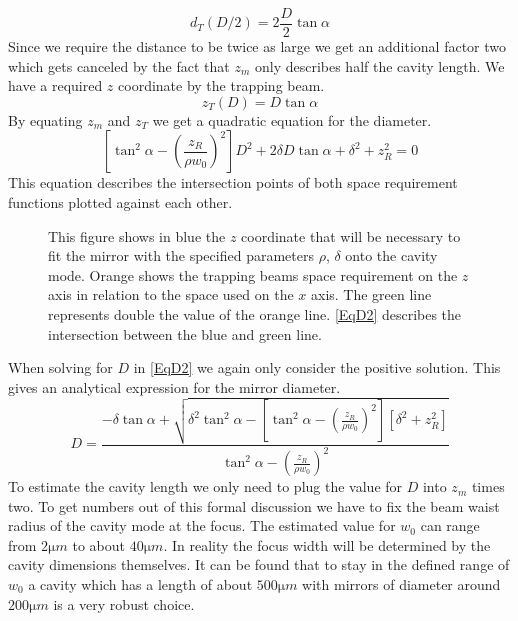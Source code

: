 $$d_{\si{T}}(D/2)=2\frac{D}{2}\tan\alpha$$
Since we require the distance to be twice as large we get an additional factor two which gets canceled by the fact that $z_{\si{m}}$ only describes half the cavity length. We have a required $z$ coordinate by the trapping beam.
\begin{equation}
	z_{\si{T}}(D)=D\tan\alpha
\end{equation}
By equating $z_{\si{m}}$ and $z_{\si{T}}$ we get a quadratic equation for the diameter.
\begin{equation}\label{EqD2}
	\left[\tan^2\alpha-\left(\frac{z_{\si{R}}}{\rho w_0}\right)^2\right]D^2+2\delta D\tan\alpha+\delta^2+z_{\si{R}}^2=0
\end{equation}
This equation describes the intersection points of both space requirement functions plotted against each other.
\begin{figure}[H]
	
	\caption{This figure shows in blue the $z$ coordinate that will be necessary to fit the mirror with the specified parameters $\rho$, $\delta$ onto the cavity mode. Orange shows the trapping beams space requirement on the $z$ axis in relation to the space used on the $x$ axis. The green line represents double the value of the orange line. \autoref{EqD2} describes the intersection between the blue and green line.}
\end{figure}
When solving for $D$ in \autoref{EqD2} we again only consider the positive solution. This gives an analytical expression for the mirror diameter.
\begin{equation}
	D=\frac{-\delta\tan\alpha+\sqrt{\delta^2\tan^2\alpha -\left[\tan^2\alpha-\left(\frac{z_{\si{R}}}{\rho w_0}\right)^2\right]\left[\delta^2+z_{\si{R}}^2\right]}}{\tan^2\alpha-\left(\frac{z_{\si{R}}}{\rho w_0}\right)^2}
\end{equation}
To estimate the cavity length we only need to plug the value for $D$ into $z_{\si{m}}$ times two. To get numbers out of this formal discussion we have to fix the beam waist radius of the cavity mode at the focus. The estimated value for $w_0$ can range from $2\si{\micro m}$ to about $40\si{\micro m}$. In reality the focus width will be determined by the cavity dimensions themselves. It can be found that to stay in the defined range of $w_0$ a cavity which has a length of about $500\si{\micro m}$ with mirrors of diameter around $200\si{\micro m}$ is a very robust choice.

